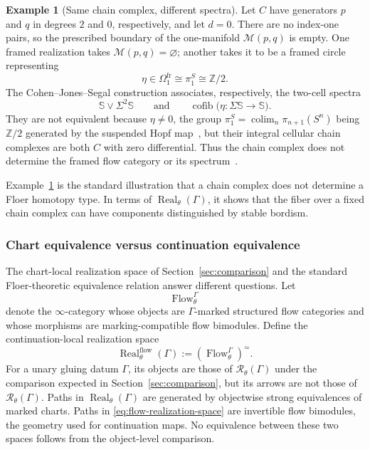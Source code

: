 \documentclass[11pt,letterpaper,twoside]{article}
\theoremstyle{plain}
\theoremstyle{definition}
\newtheorem{example}[theorem]{Example}
\theoremstyle{remark}
\let\cite\citep
\newcommand{\Real}{\operatorname{Real}}
\begin{document}
\begin{example}[Same chain complex, different spectra]\label{ex:eta-flow}
Let \(C\) have generators \(p\) and \(q\) in degrees \(2\) and \(0\), respectively, and let \(d=0\).  There are no index-one pairs, so the prescribed boundary of the one-manifold \(\mathcal M(p,q)\) is empty.  One framed realization takes \(\mathcal M(p,q)=\varnothing\); another takes it to be a framed circle representing
\[
 \eta\in\Omega_1^{\mathrm{fr}}
 \cong\pi_1^S\cong\mathbb Z/2.
\]
The Cohen--Jones--Segal construction associates, respectively, the two-cell spectra
\begin{equation}\label{eq:eta-cofibers}
 \mathbb S\vee\Sigma^2\mathbb S
 \qquad\text{and}\qquad
 \operatorname{cofib}
 \bigl(\eta:\Sigma\mathbb S\to\mathbb S\bigr).
\end{equation}
They are not equivalent because \(\eta\neq0\), the group \(\pi_1^S=\operatorname{colim}_n\pi_{n+1}(S^n)\) being \(\mathbb Z/2\) generated by the suspended Hopf map~\cite[Cor.~4J.4]{hatcher2002}, but their integral cellular chain complexes are both \(C\) with zero differential.  Thus the chain complex does not determine the framed flow category or its spectrum~\cite{cohenjonessegal1995,abouzaidblumberg2024}.
\end{example}

Example~\ref{ex:eta-flow} is the standard illustration that a chain complex does not determine a Floer homotopy type.  In terms of \(\Real_\theta(\Gamma)\), it shows that the fiber over a fixed chain complex can have components distinguished by stable bordism.

\subsubsection{Chart equivalence versus continuation equivalence}

The chart-local realization space of Section~\ref{sec:comparison} and the standard Floer-theoretic equivalence relation answer different questions.  Let
\[
 \operatorname{Flow}_\theta^\Gamma
\]
denote the \(\infty\)-category whose objects are \(\Gamma\)-marked structured flow categories and whose morphisms are marking-compatible flow bimodules.  Define the continuation-local realization space
\begin{equation}\label{eq:flow-realization-space}
 \Real_\theta^{\mathrm{flow}}(\Gamma)
 :=\left(\operatorname{Flow}_\theta^\Gamma\right)^\simeq.
\end{equation}
For a unary gluing datum \(\Gamma\), its objects are those of \(\mathcal R_\theta(\Gamma)\) under the comparison expected in Section~\ref{sec:comparison}, but its arrows are not those of \(\mathcal R_\theta(\Gamma)\).  Paths in \(\Real_\theta(\Gamma)\) are generated by objectwise strong equivalences of marked charts.  Paths in \eqref{eq:flow-realization-space} are invertible flow bimodules, the geometry used for continuation maps.  No equivalence between these two spaces follows from the object-level comparison.
\end{document}
